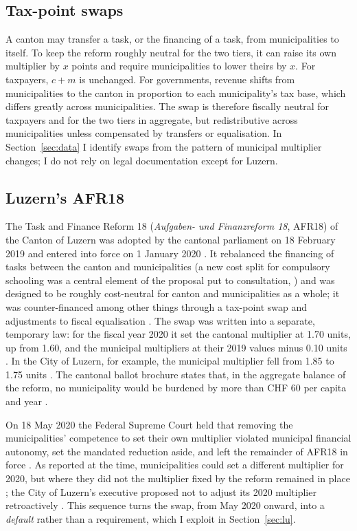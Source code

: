 \documentclass[11pt,a4paper]{article}
\begin{document}
\subsection{Tax-point swaps}
A canton may transfer a task, or the financing of a task, from municipalities to itself. To keep the reform roughly neutral for the two tiers, it can raise its own multiplier by $x$ points and require municipalities to lower theirs by $x$. For taxpayers, $c+m$ is unchanged. For governments, revenue shifts from municipalities to the canton in proportion to each municipality's tax base, which differs greatly across municipalities. The swap is therefore fiscally neutral for taxpayers and for the two tiers in aggregate, but redistributive across municipalities unless compensated by transfers or equalisation. In Section~\ref{sec:data} I identify swaps from the pattern of municipal multiplier changes; I do not rely on legal documentation except for Luzern.

\subsection{Luzern's AFR18}
The Task and Finance Reform 18 (\emph{Aufgaben- und Finanzreform 18}, AFR18) of the Canton of Luzern was adopted by the cantonal parliament on 18 February 2019 and entered into force on 1 January 2020 \citep{BGer2020}. It rebalanced the financing of tasks between the canton and municipalities (a new cost split for compulsory schooling was a central element of the proposal put to consultation, \citealp{GemeindenLU2018}) and was designed to be roughly cost-neutral for canton and municipalities as a whole; it was counter-financed among other things through a tax-point swap and adjustments to fiscal equalisation \citep{KantonLU2019}. The swap was written into a separate, temporary law: for the fiscal year 2020 it set the cantonal multiplier at 1.70 units, up from 1.60, and the municipal multipliers at their 2019 values minus 0.10 units \citep{BGer2020}. In the City of Luzern, for example, the municipal multiplier fell from 1.85 to 1.75 units \citep{StadtLU2020}. The cantonal ballot brochure states that, in the aggregate balance of the reform, no municipality would be burdened by more than CHF 60 per capita and year \citep{KantonLU2019}.

On 18 May 2020 the Federal Supreme Court held that removing the municipalities' competence to set their own multiplier violated municipal financial autonomy, set the mandated reduction aside, and left the remainder of AFR18 in force \citep{BGer2020}. As reported at the time, municipalities could set a different multiplier for 2020, but where they did not the multiplier fixed by the reform remained in place \citep{SRF2020}; the City of Luzern's executive proposed not to adjust its 2020 multiplier retroactively \citep{StadtLU2020}. This sequence turns the swap, from May 2020 onward, into a \emph{default} rather than a requirement, which I exploit in Section~\ref{sec:lu}.
\end{document}

